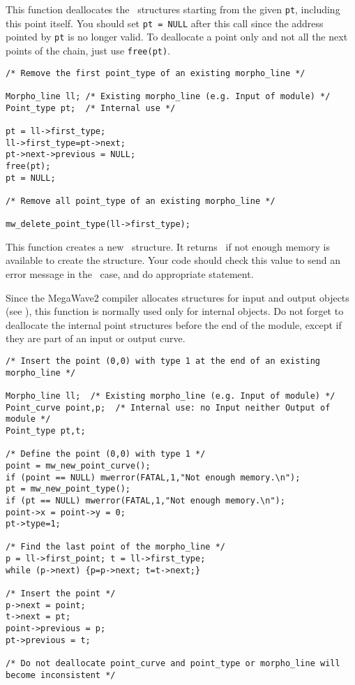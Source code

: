 \newpage %


\Description
This function deallocates the \pt\ structures starting from
the given \verb+pt+, including this point itself.
You should set \verb+pt = NULL+ after this call since the address pointed
by \verb+pt+ is no longer valid.
To deallocate a point only and not all the next points of the
chain, just use \verb+free(pt)+.

\Next
\Example
\begin{verbatim}
/* Remove the first point_type of an existing morpho_line */

Morpho_line ll; /* Existing morpho_line (e.g. Input of module) */
Point_type pt;  /* Internal use */

pt = ll->first_type;
ll->first_type=pt->next;
pt->next->previous = NULL;
free(pt);
pt = NULL;

/* Remove all point_type of an existing morpho_line */

mw_delete_point_type(ll->first_type);
\end{verbatim}

\newpage %


\Description
This function creates a new \pt\ structure.
It returns \Null\ if not enough memory is available to create the structure.
Your code should check this value to send an
error message in the \Null\ case, and do appropriate statement.

Since the MegaWave2 compiler allocates structures for input and output 
objects (see \volI), this function is normally used only for internal objects.
Do not forget to deallocate the internal point structures before the end
of the module, except if they are part of an input or output curve.

\Next
\Example
\begin{verbatim}
/* Insert the point (0,0) with type 1 at the end of an existing morpho_line */

Morpho_line ll;  /* Existing morpho_line (e.g. Input of module) */
Point_curve point,p;  /* Internal use: no Input neither Output of module */
Point_type pt,t;

/* Define the point (0,0) with type 1 */
point = mw_new_point_curve();
if (point == NULL) mwerror(FATAL,1,"Not enough memory.\n");
pt = mw_new_point_type();
if (pt == NULL) mwerror(FATAL,1,"Not enough memory.\n");
point->x = point->y = 0;
pt->type=1;

/* Find the last point of the morpho_line */
p = ll->first_point; t = ll->first_type; 
while (p->next) {p=p->next; t=t->next;}

/* Insert the point */
p->next = point;
t->next = pt;
point->previous = p;
pt->previous = t;

/* Do not deallocate point_curve and point_type or morpho_line will become inconsistent */ 
\end{verbatim}
\newpage %

